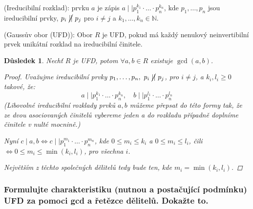 \documentclass[10pt,a4paper]{article}
\newtheorem{dusledek}{Důsledek}
\newcommand{\N}{{\mathbb{N}}}       %
\begin{document}
 (Ireducibilní rozklad): \normalfont prvku $a$ je zápis $a \mid\mid p_1^{k_1} \cdot \ldots \cdot p_n^{k_n}$, kde $p_1, \ldots, p_n$ jsou ireducibilní prvky, $p_i ~\cancel{\mid\mid}~ p_j$ pro $i \neq j$ a $k_1, \ldots, k_n \in \N$. 

 (Gaussův obor (UFD)): \normalfont Obor $R$ je UFD, pokud má každý nenulový neinvertibilní prvek unikátní rozklad na ireducibilní činitele.

\begin{dusledek}
    Nechť $R$ je UFD, potom $\forall a,b \in R$ existuje $\gcd(a,b)$.
    \begin{proof}
        Uvažujme ireducibilní prvky $p_1, \ldots, p_n, ~ p_i ~\cancel{\mid\mid}~ p_j$, pro $i \neq j$, a $k_i, l_i \geq 0$ takové, že:
        $$a \mid\mid p^{k_1}_1 \cdot \ldots \cdot p^{k_n}_n, \quad b \mid\mid p^{l_1}_1 \cdot \ldots \cdot p^{l_n}_n$$
        \textit{(Libovolné ireducibilní rozklady prvků $a, b$ můžeme přepsat do této formy tak, že ze dvou asociovaných činitelů vybereme jeden a do rozkladu případně doplníme činitele v nulté mocnině.)}
        
        Nyní $c \mid a, b \iff c \mid\mid p_1^{m_1} \cdot \ldots \cdot p_n^{m_n}$,
        kde $0 \leq m_i \leq k_i$ a $0 \leq m_i \leq l_i$, čili $\iff 0 \leq m_i \leq \min(k_i, l_i)$, pro všechna $i$. 
        
        Největším z těchto společných dělitelů tedy bude ten, kde $m_i = \min(k_i, l_i)$.
    \end{proof}
\end{dusledek}

\subsubsection{Formulujte charakteristiku (nutnou a postačující podmínku) UFD za pomoci gcd a řetězce dělitelů. Dokažte to.}
\end{document}
